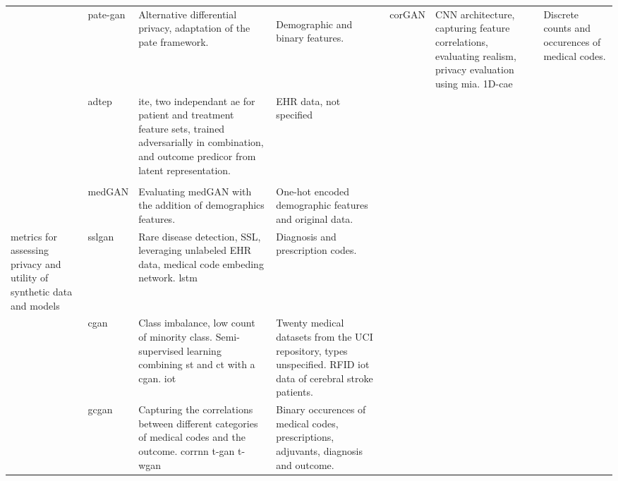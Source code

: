 \begin{sidewaystable}[htbp]
\begin{tabularx}{\textwidth}{@{}p{4cm}XXX@{}}
            \cite{Jordon2019}
            & \gls{pate-gan}
            & Alternative differential privacy, adaptation of the  \gls{pate} framework.
            & Demographic and binary features.
            
            \cite{torfi2019generating}
            & \gls{corGAN}
            & \gls{CNN} architecture, capturing feature correlations, evaluating realism, privacy evaluation using \gls{mia}. 1D-\gls{cae}
            & Discrete counts and occurences of medical codes.\\
            
            
            \cite{chu2019treatment}
            & \gls{adtep}
            & \gls{ite}, two independant \gls{ae} for patient and treatment feature sets, trained adversarially in combination, and outcome predicor 			from latent representation. 
            & EHR data, not specified\\
            
            \cite{severo2019ward2icu}
            & 
            & 
            &\\
            
            \cite{Jackson_2019}
            & \gls{medGAN}
            & Evaluating medGAN with the addition of demographics features.
            & One-hot encoded demographic features and original data. \\
            
            metrics for assessing privacy and utility of synthetic data and models
            \cite{yu2019rare}
            & \gls{sslgan}
            & Rare disease detection, \gls{SSL}, leveraging unlabeled \gls{EHR} data, medical code embeding network. \gls{lstm}
            & Diagnosis and prescription codes.\\
            
            
            \cite{Yang_2019_cdss}
            & \gls{cgan}
            & Class imbalance, low count of minority class. Semi-supervised learning combining \gls{st} and \gls{ct} with a \gls{cgan}. \gls{iot}
            & Twenty medical datasets from the UCI repository, types unspecified. RFID \gls{iot} data of cerebral stroke patients.\\
            
            
            \cite{Yang_2019_ehr}
            &  \gls{gcgan}
            & Capturing the correlations between different categories of medical codes and the outcome. \gls{corrnn} \gls{t-gan} \gls{t-wgan}
            & Binary occurences of medical codes, prescriptions, adjuvants, diagnosis and outcome.\\
            

\end{tabularx}
\end{sidewaystable}
